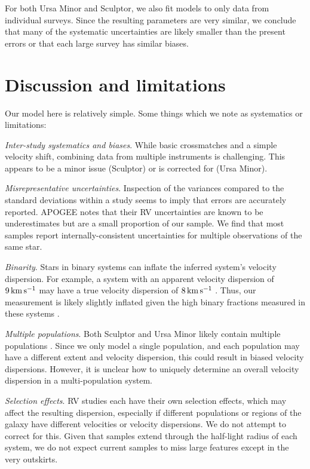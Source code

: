 For both Ursa Minor and Sculptor, we also fit models to only data from
individual surveys. Since the resulting parameters are very similar, we
conclude that many of the systematic uncertainties are likely smaller
than the present errors or that each large survey has similar biases.

\section{Discussion and limitations}\label{discussion-and-limitations}

Our model here is relatively simple. Some things which we note as
systematics or limitations:

\emph{Inter-study systematics and biases}. While basic crossmatches and
a simple velocity shift, combining data from multiple instruments is
challenging. This appears to be a minor issue (Sculptor) or is corrected
for (Ursa Minor).

\emph{Misrepresentative uncertainties}. Inspection of the variances
compared to the standard deviations within a study seems to imply that
errors are accurately reported. APOGEE notes that their RV uncertainties
are known to be underestimates but are a small proportion of our sample.
We find that most samples report internally-consistent uncertainties for
multiple observations of the same star.

\emph{Binarity}. Stars in binary systems can inflate the inferred
system's velocity dispersion. For example, a system with an apparent
velocity dispersion of \(9\,{\rm km\,s^{-1}}\) may have a true velocity dispersion
of \(8\,{\rm km\,s^{-1}}\) \citep{spencer+2017}. Thus, our measurement is likely
slightly inflated given the high binary fractions measured in these
systems \citep{spencer+2018, arroyo-polonio+2023, gration+2025}.

\emph{Multiple populations}. Both Sculptor and Ursa Minor likely contain
multiple populations \citep[\citet{pace+2020},
\citet{tolstoy+2004}]{arroyo-polonio+2024}. Since we only model a single
population, and each population may have a different extent and velocity
dispersion, this could result in biased velocity dispersions. However,
it is unclear how to uniquely determine an overall velocity dispersion
in a multi-population system.

\emph{Selection effects}. RV studies each have their own selection
effects, which may affect the resulting dispersion, especially if
different populations or regions of the galaxy have different velocities
or velocity dispersions. We do not attempt to correct for this. Given
that samples extend through the half-light radius of each system, we do
not expect current samples to miss large features except in the very
outskirts.

